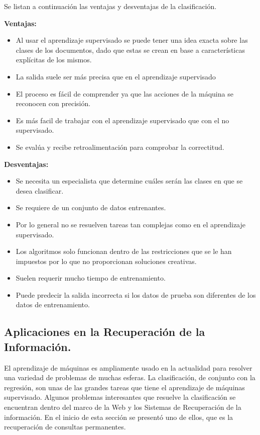 \documentclass{llncs}
\begin{document}
		Se listan a continuaci\'on las ventajas y desventajas de la clasificaci\'on.
		
			\smallskip
			 \textbf{Ventajas:}
				\begin{itemize}
					\item Al usar el aprendizaje supervisado se puede tener una idea exacta sobre las clases de los documentos, dado que estas se crean en base a caracter\'isticas expl\'icitas de los mismos. 
					\item La salida suele ser m\'as precisa que en el aprendizaje supervisado
					\item El proceso es f\'acil de comprender ya que las acciones de la m\'aquina se reconocen con precisi\'on.
					\item Es m\'as facil de trabajar con el aprendizaje supervisado que con el no supervisado. 
					\item Se eval\'ua y recibe retroalimentaci\'on para comprobar la correctitud. 
				\end{itemize}
		
				\smallskip
				\textbf{Desventajas:}
				\begin{itemize}
					\item Se necesita un especialista que determine cu\'ales ser\'an las clases en que se desea clasificar.
					\item Se requiere de un conjunto de datos entrenantes.
					\item Por lo general no se resuelven tareas tan complejas como en el aprendizaje supervisado.
					\item Los algoritmos solo funcionan dentro de las restricciones que se le han impuestos por lo que no proporcionan soluciones creativas.
					\item Suelen requerir mucho tiempo de entrenamiento.
					\item Puede predecir la salida incorrecta si los datos de prueba son diferentes de los datos de entrenamiento.
				\end{itemize}
				
	\subsection{Aplicaciones en la Recuperaci\'on de la Informaci\'on.} \label{App_RI}
		
		El aprendizaje de m\'aquinas es ampliamente usado en la actualidad para resolver una variedad de problemas de muchas esferas. La clasificaci\'on, de conjunto con la regresi\'on, son unas de las grandes tareas que tiene el aprendizaje de m\'aquinas supervisado. Algunos problemas interesantes que resuelve la clasificaci\'on se encuentran dentro del marco de la Web y los Sistemas de Recuperaci\'on de la informaci\'on. En el inicio de esta secci\'on se present\'o uno de ellos, que es la recuperaci\'on de consultas permanentes.
		
\end{document}
